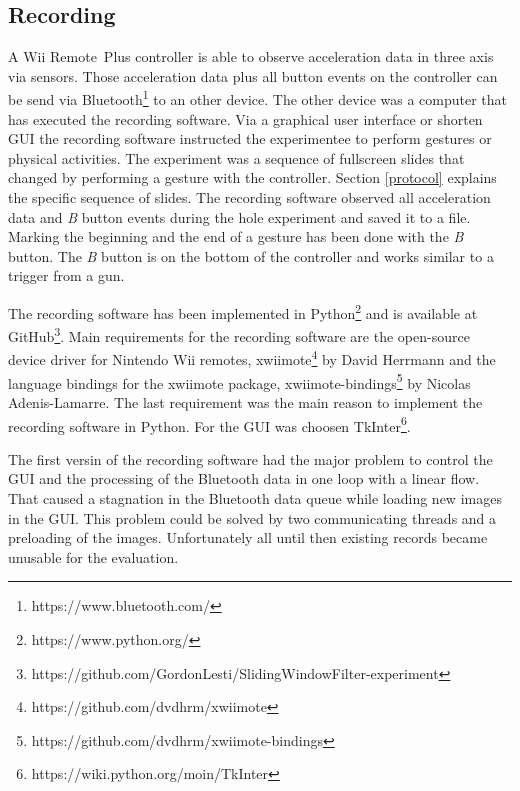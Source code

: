 \subsection{Recording} \label{recording}
A Wii Remote\texttrademark~Plus controller is able to observe acceleration data in three axis via sensors. Those
acceleration data plus all button events on the controller can be send via
Bluetooth\footnote{https://www.bluetooth.com/} to an other device. The other device was a computer that has executed the
recording software. Via a graphical user interface or shorten GUI the recording software instructed the experimentee to
perform gestures or physical activities. The experiment was a sequence of fullscreen slides that changed by performing a
gesture with the controller. Section \ref{protocol} explains the specific sequence of slides. The recording software
observed all acceleration data and \textit{B} button events during the hole experiment and saved it to a file. Marking
the beginning and the end of a gesture has been done with the \textit{B} button. The \textit{B} button is on the bottom
of the controller and works similar to a trigger from a gun.

The recording software has been implemented in Python\footnote{https://www.python.org/} and is available at
GitHub\footnote{https://github.com/GordonLesti/SlidingWindowFilter-experiment}. Main requirements for the recording
software are the open-source device driver for Nintendo Wii remotes,
xwiimote\footnote{https://github.com/dvdhrm/xwiimote} by David Herrmann and the language bindings for the xwiimote
package, xwiimote-bindings\footnote{https://github.com/dvdhrm/xwiimote-bindings} by Nicolas Adenis-Lamarre. The last
requirement was the main reason to implement the recording software in Python. For the GUI was choosen
TkInter\footnote{https://wiki.python.org/moin/TkInter}.

The first versin of the recording software had the major problem to control the GUI and the
processing of the Bluetooth data in one loop with a linear flow. That caused a stagnation in the Bluetooth data queue
while loading new images in the GUI. This problem could be solved by two communicating threads and a preloading of the
images. Unfortunately all until then existing records became unusable for the evaluation.


